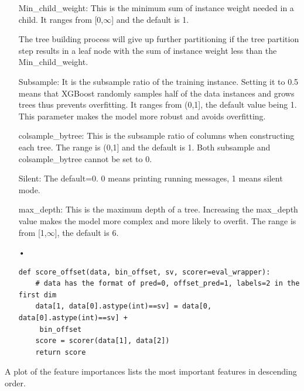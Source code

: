 \begin{enumerate}
Min\_child\_weight: This is the minimum sum of instance weight needed in a child. It ranges from [0,$\infty$] and the default is 1.

The tree building process will give up further partitioning if the tree partition step results in a leaf node with the sum of instance weight less than the Min\_child\_weight.

Subsample: It is the subsample ratio of the training instance. Setting it to 0.5 means that XGBoost randomly samples half of the data instances and grows trees thus prevents overfitting. It ranges from (0,1], the default value being 1. This parameter makes the model more robust and avoids overfitting.

colsample\_bytree: This is the subsample ratio of columns when constructing each tree. The range is (0,1] and the default is 1. Both subsample and colsample\_bytree cannot be set to 0.

Silent: The default=0. 0 means printing running messages, 1 means silent mode.

max\_depth: This is the maximum depth of a tree. Increasing the max\_depth value makes the model more complex and more likely to overfit. The range is from [1,$\infty$], the default is 6. 

\item[•] \begin{verbatim}
def score_offset(data, bin_offset, sv, scorer=eval_wrapper):
    # data has the format of pred=0, offset_pred=1, labels=2 in the first dim
    data[1, data[0].astype(int)==sv] = data[0, data[0].astype(int)==sv] +   
     bin_offset
    score = scorer(data[1], data[2])
    return score
\end{verbatim}
\end{enumerate}




\newpage
A plot of the feature importances lists the most important features in descending order.
 
